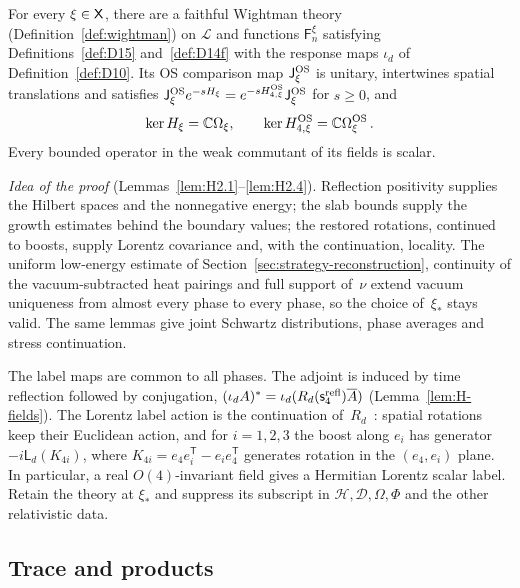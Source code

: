 \begin{theorem}[RC. Reconstruction]\label{prop:RC}
For every $\xi\in\mathsf{X}$, there are a faithful Wightman theory (Definition~\ref{def:wightman}) on $\mathcal L$ and functions $\mathsf F_n^\xi$ satisfying Definitions~\ref{def:D15} and~\ref{def:D14f} with the response maps $\iota_d$ of Definition~\ref{def:D10}. Its OS comparison map $\mathsf J_\xi^{\rm OS}$ is unitary, intertwines spatial translations and satisfies $\mathsf J_\xi^{\rm OS}e^{-sH_\xi}=e^{-sH_{4,\xi}^{\rm OS}}\mathsf J_\xi^{\rm OS}$ for $s\ge0$, and
\begin{equation*}
\ker H_\xi=\mathbb{C}\Omega_\xi,\qquad \ker H_{4,\xi}^{\rm OS}=\mathbb{C}\Omega_\xi^{\rm OS}\,.
\end{equation*}
Every bounded operator in the weak commutant of its fields is scalar.
\end{theorem}

\emph{Idea of the proof} (Lemmas~\ref{lem:H2.1}--\ref{lem:H2.4}). Reflection positivity supplies the Hilbert spaces and the nonnegative energy; the slab bounds supply the growth estimates behind the boundary values; the restored rotations, continued to boosts, supply Lorentz covariance and, with the continuation, locality. The uniform low-energy estimate of Section~\ref{sec:strategy-reconstruction}, continuity of the vacuum-subtracted heat pairings and full support of~$\nu$ extend vacuum uniqueness from almost every phase to every phase, so the choice of~$\xi_*$ stays valid. The same lemmas give joint Schwartz distributions, phase averages and stress continuation.

The label maps are common to all phases. The adjoint is induced by time reflection followed by conjugation, $(\iota_dA)^*=\iota_d(R_d(\mathsf s_4^{\rm refl})\overline A)$ (Lemma~\ref{lem:H-fields}). The Lorentz label action is the continuation of~$R_d$~\cite{FrohlichOsterwalderSeiler1983}: spatial rotations keep their Euclidean action, and for $i=1,2,3$ the boost along $e_i$ has generator $-i\mathsf L_d(K_{4i})$, where $K_{4i}=e_4e_i^{\mathsf T}-e_ie_4^{\mathsf T}$ generates rotation in the $(e_4,e_i)$ plane. In particular, a real $O(4)$-invariant field gives a Hermitian Lorentz scalar label. Retain the theory at $\xi_*$ and suppress its subscript in $\mathcal H,\mathcal D,\Omega,\Phi$ and the other relativistic data.

\subsection{Trace and products}\label{sec:trace-products}


